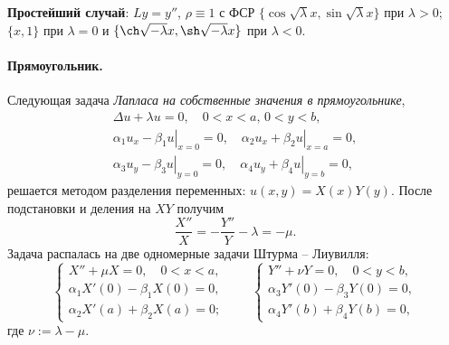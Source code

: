 \label{sec:prost_sl}
\textbf{Простейший случай}: $ Ly = y'' $, $ \rho \equiv 1 $ с ФСР $
\{\cos\sqrt\lambda x, \sin\sqrt\lambda x\} $ при $ \lambda > 0 $; $ \{x, 1\} $
при $ \lambda = 0 $ и $ \{\ch\sqrt{-\lambda}x, \sh\sqrt{-\lambda}x\} $ при $
\lambda < 0 $.



\paragraph{Прямоугольник.}
Следующая задача \emph{Лапласа на собственные значения в прямоугольнике},  
\begin{gather*}
    \Delta u + \lambda u = 0, \quad 0 < x < a, \, 0 < y < b,\\
    \left.\alpha_1u_x - \beta_1u\right|_{x=0} = 0, \quad \left.\alpha_2u_x +
      \beta_2u\right|_{x=a} = 0,\\
      \left.\alpha_3 u_y - \beta_3u\right|_{y=0} = 0, \quad \left.\alpha_4u_y +
        \beta_4 u\right|_{y=b} = 0,
\end{gather*}
решается методом разделения переменных: $ u(x, y) = X(x)Y(y) $. После
подстановки и деления на $ XY $ получим 
\[
    \frac{X''}{X} = - \frac{Y''}{Y} - \lambda = -\mu.
\]
Задача распалась на две одномерные задачи Штурма -- Лиувилля: 
\[
  \begin{cases}
    X'' + \mu X = 0, \quad 0 < x < a,\\
    \alpha_1 X'(0) - \beta_1 X(0) = 0,\\
    \alpha_2 X'(a) + \beta_2 X(a) = 0;
  \end{cases} \qquad
  \begin{cases}
    Y'' + \nu Y = 0, \quad 0 < y < b,\\
    \alpha_3 Y'(0) - \beta_3 Y(0) = 0,\\
    \alpha_4 Y'(b) + \beta_4 Y(b) = 0,
  \end{cases}
\]
где $ \nu := \lambda - \mu $.

